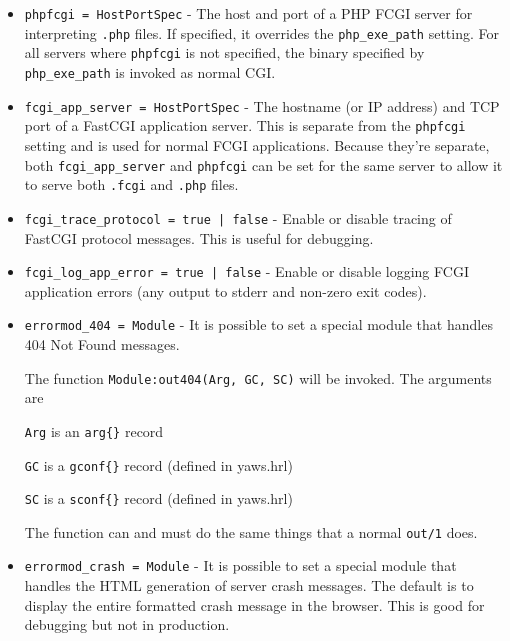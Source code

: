 \documentclass[11pt,oneside,english]{book}
\begin{document}
\begin{itemize}
\item       \verb+phpfcgi = HostPortSpec+ -
              The host and port of a PHP FCGI server for interpreting
              \verb+.php+ files. If specified, it overrides the
              \verb+php_exe_path+ setting. For all servers where
              \verb+phpfcgi+ is not specified, the binary specified by
              \verb+php_exe_path+ is invoked as normal CGI.

\item       \verb+fcgi_app_server = HostPortSpec+ -
              The hostname (or IP address) and TCP port of a
              FastCGI application server. This is separate from the
              \verb+phpfcgi+ setting and is used for normal FCGI
              applications. Because they're separate, both
              \verb+fcgi_app_server+ and \verb+phpfcgi+ can be set for
              the same server to allow it to serve both \verb+.fcgi+
              and \verb+.php+ files.

\item       \verb+fcgi_trace_protocol = true | false+ -
              Enable or disable tracing of FastCGI protocol
              messages. This is useful for debugging.

\item       \verb+fcgi_log_app_error = true | false+ -
              Enable or disable logging FCGI application errors (any
              output to stderr and non-zero exit codes).

\item     \verb+errormod_404 = Module+ -
              It is possible to set a special module  that
              handles 404 Not Found messages.

              The function \verb+Module:out404(Arg, GC, SC)+ will
              be invoked. The arguments are

              \verb+Arg+ is an \verb+arg{}+ record

              \verb+GC+ is a \verb+gconf{}+ record (defined in
              yaws.hrl)

              \verb+SC+ is a \verb+sconf{}+ record (defined in
              yaws.hrl)

              The function can and must do the same things
              that a normal \verb+out/1+ does.

\item       \verb+errormod_crash = Module+ -
              It  is possible to set a special module that
              handles the HTML generation of server  crash
              messages.  The  default  is  to  display the
              entire  formatted  crash   message   in   the
              browser.  This is good for debugging but not
              in production.


\end{itemize}
\end{document}
